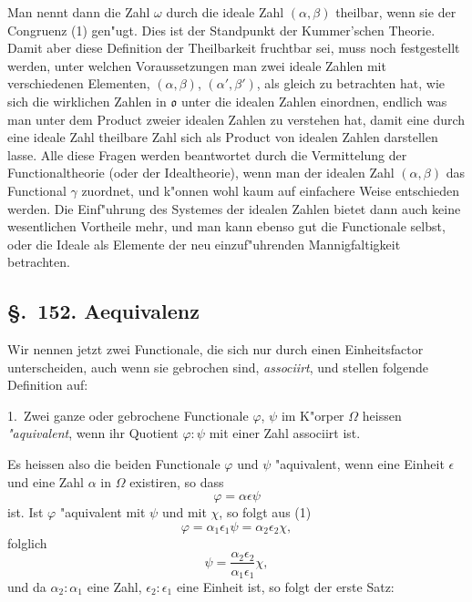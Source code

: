 \documentclass[12pt,a4paper]{article}
\theoremstyle{definition}
\begin{document}
Man nennt dann die Zahl $\omega$ durch die ideale Zahl $(\alpha, \beta)$ theilbar, wenn sie der Congruenz (1) gen"ugt. Dies ist der Standpunkt der Kummer'schen Theorie. Damit aber diese Definition der Theilbarkeit fruchtbar sei, muss noch festgestellt werden, unter welchen Voraussetzungen man zwei ideale Zahlen mit verschiedenen Elementen, $(\alpha, \beta)$, $(\alpha', \beta')$, als gleich zu betrachten hat, wie sich die wirklichen Zahlen in $\mathfrak{o}$ unter die idealen Zahlen einordnen, endlich was man unter dem Product zweier idealen Zahlen zu verstehen hat, damit eine durch eine ideale Zahl theilbare Zahl sich als Product von idealen Zahlen darstellen lasse. Alle diese Fragen werden beantwortet durch die Vermittelung der Functionaltheorie (oder der Idealtheorie), wenn man der idealen Zahl $(\alpha, \beta)$ das Functional $\gamma$ zuordnet, und k"onnen wohl kaum auf einfachere Weise entschieden werden. Die Einf"uhrung des Systemes der idealen Zahlen bietet dann auch keine wesentlichen Vortheile mehr, und man kann ebenso gut die Functionale selbst, oder die Ideale als Elemente der neu einzuf"uhrenden Mannigfaltigkeit betrachten.


\subsection*{\S.~152. Aequivalenz}

Wir nennen jetzt zwei Functionale, die sich nur durch einen Einheitsfactor unterscheiden, auch wenn sie gebrochen sind, \emph{associirt}, und stellen folgende Definition auf:

1.~Zwei ganze oder gebrochene Functionale $\varphi$, $\psi$ im K"orper $\Omega$ heissen \emph{"aquivalent}, wenn ihr Quotient $\varphi : \psi$ mit einer Zahl associirt ist.

Es heissen also die beiden Functionale $\varphi$ und $\psi$ "aquivalent, wenn eine Einheit $\epsilon$ und eine Zahl $\alpha$ in $\Omega$ existiren, so dass
\begin{equation}
\varphi = \alpha\epsilon\psi
\end{equation}
ist. Ist $\varphi$ "aquivalent mit $\psi$ und mit $\chi$, so folgt aus (1)
\begin{equation}
\varphi = \alpha_1\epsilon_1\psi = \alpha_2\epsilon_2\chi,
\end{equation}
folglich
\begin{equation}
\psi = \frac{\alpha_2\epsilon_2}{\alpha_1\epsilon_1}\chi,
\end{equation}
und da $\alpha_2 : \alpha_1$ eine Zahl, $\epsilon_2 : \epsilon_1$ eine Einheit ist, so folgt der erste Satz:
\end{document}
